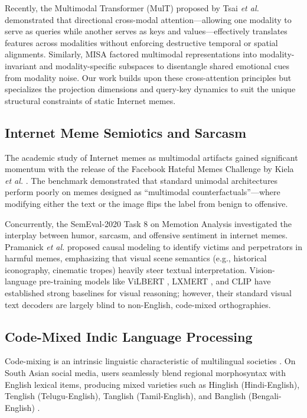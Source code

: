 \documentclass[10pt,journal,compsoc]{IEEEtran}
\begin{document}
Recently, the Multimodal Transformer (MulT) proposed by Tsai \textit{et al.} \cite{tsai2019multimodal} demonstrated that directional cross-modal attention—allowing one modality to serve as queries while another serves as keys and values—effectively translates features across modalities without enforcing destructive temporal or spatial alignments. Similarly, MISA \cite{hazarika2020misa} factored multimodal representations into modality-invariant and modality-specific subspaces to disentangle shared emotional cues from modality noise. Our work builds upon these cross-attention principles but specializes the projection dimensions and query-key dynamics to suit the unique structural constraints of static Internet memes.

\subsection{Internet Meme Semiotics and Sarcasm}
The academic study of Internet memes as multimodal artifacts gained significant momentum with the release of the Facebook Hateful Memes Challenge by Kiela \textit{et al.} \cite{kiela2020hateful}. The benchmark demonstrated that standard unimodal architectures perform poorly on memes designed as ``multimodal counterfactuals''—where modifying either the text or the image flips the label from benign to offensive. 

Concurrently, the SemEval-2020 Task 8 on Memotion Analysis \cite{sharma2020semeval} investigated the interplay between humor, sarcasm, and offensive sentiment in internet memes. Pramanick \textit{et al.} \cite{pramanick2021detecting} proposed causal modeling to identify victims and perpetrators in harmful memes, emphasizing that visual scene semantics (e.g., historical iconography, cinematic tropes) heavily steer textual interpretation. Vision-language pre-training models like ViLBERT \cite{lu2019vilbert}, LXMERT \cite{tan2019lxmert}, and CLIP \cite{radford2021learning} have established strong baselines for visual reasoning; however, their standard visual text decoders are largely blind to non-English, code-mixed orthographies.

\subsection{Code-Mixed Indic Language Processing}
Code-mixing is an intrinsic linguistic characteristic of multilingual societies \cite{bali2014borrowing}. On South Asian social media, users seamlessly blend regional morphosyntax with English lexical items, producing mixed varieties such as Hinglish (Hindi-English), Tenglish (Telugu-English), Tanglish (Tamil-English), and Banglish (Bengali-English) \cite{chandra2021subword, banerjee2018dataset}. 
\end{document}
